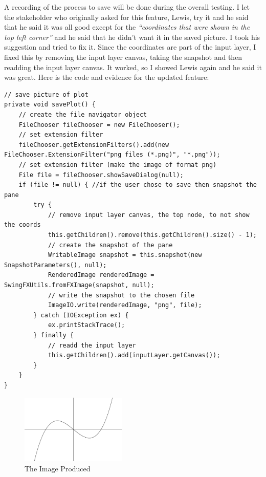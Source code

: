 \documentclass[../../../../main.tex]{subfiles}
\begin{document}
A recording of the process to save will be done during the overall testing.
\newpage\noindent
I let the stakeholder who originally asked for this feature, Lewis, try it and he said that he said it was all good except for the \textit{``coordinates that were shown in the top left corner''} and he said that he didn't want it in the saved picture. I took his suggestion and tried to fix it. Since the coordinates are part of the input layer, I fixed this by removing the input layer canvas, taking the snapshot and then readding the input layer canvas. It worked, so I showed Lewis again and he said it was great. Here is the code and evidence for the updated feature:
\begin{verbatim}
// save picture of plot
private void savePlot() {
	// create the file navigator object
	FileChooser fileChooser = new FileChooser();
	// set extension filter
	fileChooser.getExtensionFilters().add(new FileChooser.ExtensionFilter("png files (*.png)", "*.png"));
	// set extension filter (make the image of format png)
	File file = fileChooser.showSaveDialog(null);
	if (file != null) {	//if the user chose to save then snapshot the pane
		try {
			// remove input layer canvas, the top node, to not show the coords
			this.getChildren().remove(this.getChildren().size() - 1);
			// create the snapshot of the pane
			WritableImage snapshot = this.snapshot(new SnapshotParameters(), null);
			RenderedImage renderedImage = SwingFXUtils.fromFXImage(snapshot, null);
			// write the snapshot to the chosen file
			ImageIO.write(renderedImage, "png", file);
		} catch (IOException ex) {
			ex.printStackTrace();
		} finally {
			// readd the input layer
			this.getChildren().add(inputLayer.getCanvas());
		}
	}
}
\end{verbatim}
\begin{figure}[H]
	\centering
	\includegraphics[width=0.45\textwidth]{images/withoutCoords}
	\caption{The Image Produced}
\end{figure}
\end{document}
